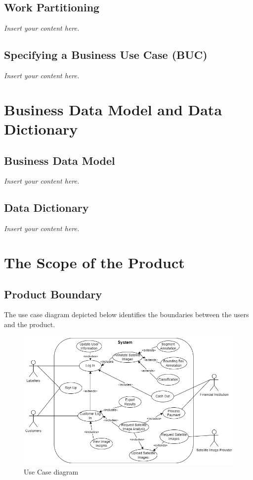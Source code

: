 \documentclass[12pt]{article}
\newcommand{\lips}{\textit{Insert your content here.}}
\begin{document}
\subsection{Work Partitioning}
\lips
\subsection{Specifying a Business Use Case (BUC)}
\lips

\section{Business Data Model and Data Dictionary}
\subsection{Business Data Model}
\lips
\subsection{Data Dictionary}
\lips

\section{The Scope of the Product}
\subsection{Product Boundary}
The use case diagram depicted below identifies the boundaries between the users and the product.
\begin{figure}[H]
    \centering
    \includegraphics[scale=0.63]{useCaseDiagram.png}
    \caption{Use Case diagram}
    \label{fig:usecase}
\end{figure}
\end{document}

